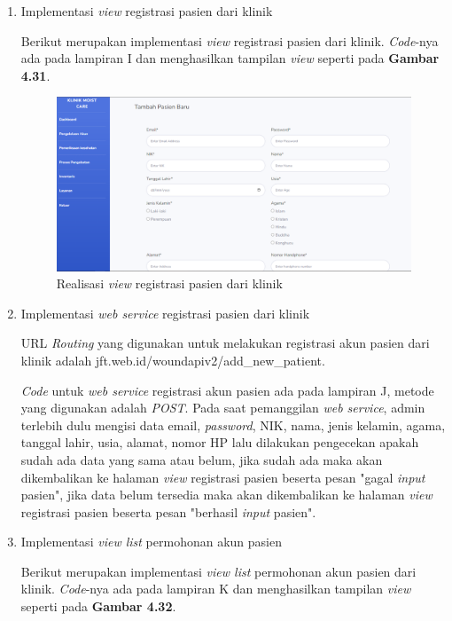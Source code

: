 \begin{enumerate}
	\item Implementasi \emph{view} registrasi pasien dari klinik
	
	Berikut merupakan implementasi \emph{view} registrasi pasien dari klinik. \emph{Code}-nya ada pada lampiran I dan menghasilkan tampilan \emph{view} seperti pada \textbf{Gambar 4.31}.
	
	\begin{figure}[H]
		\centering
		\includegraphics[width=14cm]{gambar/tambah_pasien_view.png}
		\caption{Realisasi \emph{view} registrasi pasien dari klinik} 
		\label{Gambar:usecaseadminjurnalpertama}
	\end{figure}
	
	\break
	\item Implementasi \emph{web service} registrasi pasien dari klinik
	
	URL \emph{Routing} yang digunakan untuk melakukan registrasi akun pasien dari klinik adalah jft.web.id/woundapiv2/add\_new\_patient.
	
	\emph{Code} untuk \emph{web service} registrasi akun pasien ada pada lampiran J, metode yang digunakan adalah \emph{POST}. Pada saat pemanggilan \emph{web service}, admin terlebih dulu mengisi data email, \emph{password}, NIK, nama, jenis kelamin, agama, tanggal lahir, usia, alamat, nomor HP lalu dilakukan pengecekan apakah sudah ada data yang sama atau belum, jika sudah ada maka akan dikembalikan ke halaman \emph{view} registrasi pasien beserta pesan "gagal \emph{input} pasien", jika data belum tersedia maka akan dikembalikan ke halaman \emph{view} registrasi pasien beserta pesan "berhasil \emph{input} pasien".
	
	\item Implementasi \emph{view list} permohonan akun pasien
	
	Berikut merupakan implementasi \emph{view list} permohonan akun pasien dari klinik. \emph{Code}-nya ada pada lampiran K dan menghasilkan tampilan \emph{view} seperti pada \textbf{Gambar 4.32}.
	

\end{enumerate}
